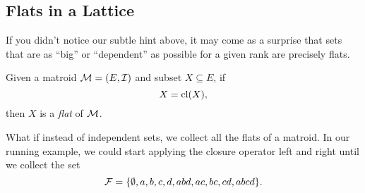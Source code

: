 \documentclass[12pt,oneside]{../../sfsuthesis}
\begin{document}
\subsection{Flats in a Lattice}

If you didn't notice our subtle hint above, it may come as a surprise that sets that are as ``big'' or ``dependent'' as possible for a given rank are precisely flats.

\begin{definition}[Flat]\th\label{def:flat}
    Given a matroid \( \mathcal{M} = (E, \mathcal{I}) \) and subset \( X \subseteq E \), if
    \[
        X = \operatorname{cl}(X),
    \]
    then \( X \) is a \emph{flat} of \( \mathcal{M} \).
\end{definition}

What if instead of independent sets, we collect all the flats of a matroid.
In our running example, we could start applying the closure operator left and right until we collect the set
\[
    \mathcal{F} = \{ \emptyset, a, b, c, d, abd, ac, bc, cd, abcd \}.
\]
\end{document}
